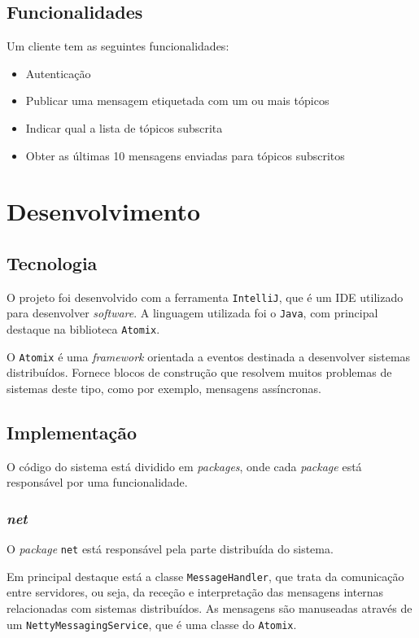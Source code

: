 \documentclass[12pt, a4paper]{report}
\begin{document}
\section{Funcionalidades}
Um cliente tem as seguintes funcionalidades:
\begin{itemize}
    \item Autenticação
    \item Publicar uma mensagem etiquetada com um ou mais tópicos
    \item Indicar qual a lista de tópicos subscrita
    \item Obter as últimas 10 mensagens enviadas para tópicos subscritos
\end{itemize}

\chapter{Desenvolvimento}
\section{Tecnologia}
O projeto foi desenvolvido com a ferramenta \texttt{IntelliJ}, que é um IDE utilizado para desenvolver \textit{software}.
A linguagem utilizada foi o \texttt{Java}, com principal destaque na biblioteca \texttt{Atomix}.

O \texttt{Atomix} é uma \textit{framework} orientada a eventos destinada a desenvolver sistemas distribuídos. Fornece blocos de construção que resolvem muitos problemas de sistemas deste tipo, como por exemplo, mensagens assíncronas.

\section{Implementação}
O código do sistema está dividido em \textit{packages}, onde cada \textit{package} está responsável por uma funcionalidade.


\subsection{\textit{net}}
O \textit{package} \texttt{net} está responsável pela parte distribuída do sistema.

Em principal destaque está a classe \texttt{MessageHandler}, que trata da comunicação entre servidores, ou seja, da receção e interpretação das mensagens internas relacionadas com sistemas distribuídos.
As mensagens são manuseadas através de um \texttt{NettyMessagingService}, que é uma classe do \texttt{Atomix}.
\end{document}
